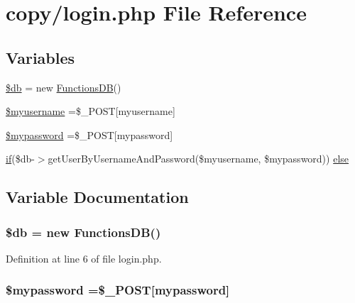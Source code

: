 \hypertarget{copy_2login_8php}{}\section{copy/login.php File Reference}
\label{copy_2login_8php}
\subsection*{Variables}
\begin{DoxyCompactItemize}
\item 
\hyperlink{copy_2login_8php_a1fa3127fc82f96b1436d871ef02be319}{\$db} = new \hyperlink{class_functions_d_b}{Functions\+D\+B}()
\item 
\hyperlink{copy_2login_8php_a5dacfe932d81e07fdb90fc80dbf5a03f}{\$myusername} =\$\+\_\+\+P\+O\+S\+T\mbox{[}\textquotesingle{}myusername\textquotesingle{}\mbox{]}
\item 
\hyperlink{copy_2login_8php_a8a8ddd334c184fadadf1a10b53126c95}{\$mypassword} =\$\+\_\+\+P\+O\+S\+T\mbox{[}\textquotesingle{}mypassword\textquotesingle{}\mbox{]}
\item 
\hyperlink{php_2login__success_8php_a417be69c2182c77301b6d9d54792e7e5}{if}(\$db-\/$>$get\+User\+By\+Username\+And\+Password(\$myusername, \$mypassword)) \hyperlink{copy_2login_8php_a6986c10ba08e74cdfb9f3ac3a66f9af9}{else}
\end{DoxyCompactItemize}


\subsection{Variable Documentation}
\hypertarget{copy_2login_8php_a1fa3127fc82f96b1436d871ef02be319}{}
\subsubsection[{\$db}]{\setlength{\rightskip}{0pt plus 5cm}\$db = new {\bf Functions\+D\+B}()}\label{copy_2login_8php_a1fa3127fc82f96b1436d871ef02be319}


Definition at line 6 of file login.\+php.

\hypertarget{copy_2login_8php_a8a8ddd334c184fadadf1a10b53126c95}{}
\subsubsection[{\$mypassword}]{\setlength{\rightskip}{0pt plus 5cm}\$mypassword =\$\+\_\+\+P\+O\+S\+T\mbox{[}\textquotesingle{}mypassword\textquotesingle{}\mbox{]}}\label{copy_2login_8php_a8a8ddd334c184fadadf1a10b53126c95}


